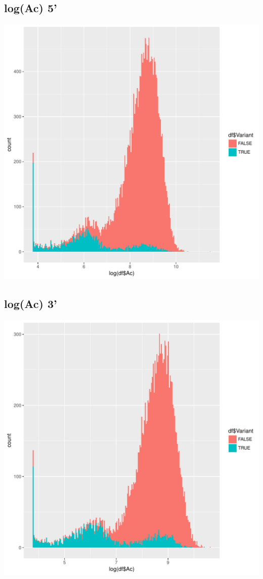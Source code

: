 \documentclass{article}\usepackage[]{graphicx}\usepackage[]{color}
\newenvironment{knitrout}{}{} %
\begin{document}
\subsection{log(Ac) 5'}
\begin{knitrout}
\color{fgcolor}
\includegraphics[width=1\linewidth]{figure/dens_5-1} 

\end{knitrout}
\clearpage
\subsection{log(Ac) 3'}
\begin{knitrout}
\color{fgcolor}
\includegraphics[width=1\linewidth]{figure/dens_3-1} 

\end{knitrout}
\clearpage
\end{document}
